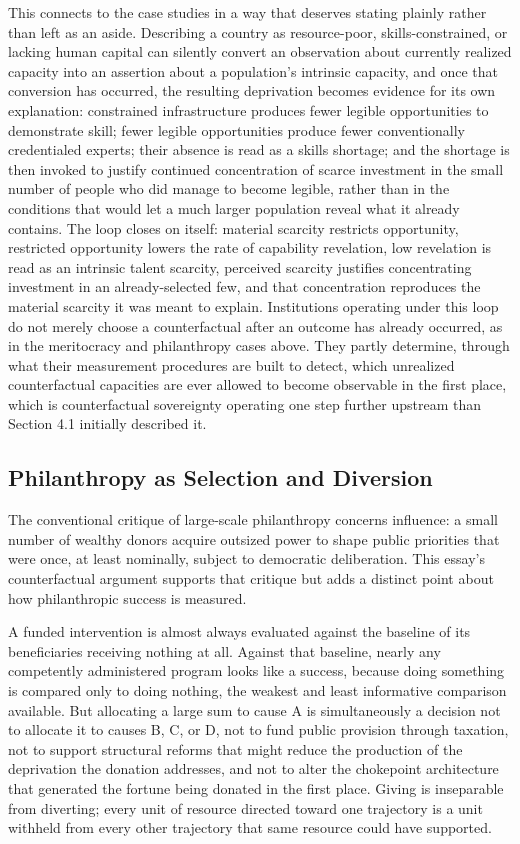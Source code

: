 \documentclass[11pt]{article}
\begin{document}
This connects to the case studies in a way that deserves stating plainly rather than left as an aside. Describing a country as resource-poor, skills-constrained, or lacking human capital can silently convert an observation about currently realized capacity into an assertion about a population's intrinsic capacity, and once that conversion has occurred, the resulting deprivation becomes evidence for its own explanation: constrained infrastructure produces fewer legible opportunities to demonstrate skill; fewer legible opportunities produce fewer conventionally credentialed experts; their absence is read as a skills shortage; and the shortage is then invoked to justify continued concentration of scarce investment in the small number of people who did manage to become legible, rather than in the conditions that would let a much larger population reveal what it already contains. The loop closes on itself: material scarcity restricts opportunity, restricted opportunity lowers the rate of capability revelation, low revelation is read as an intrinsic talent scarcity, perceived scarcity justifies concentrating investment in an already-selected few, and that concentration reproduces the material scarcity it was meant to explain. Institutions operating under this loop do not merely choose a counterfactual after an outcome has already occurred, as in the meritocracy and philanthropy cases above. They partly determine, through what their measurement procedures are built to detect, which unrealized counterfactual capacities are ever allowed to become observable in the first place, which is counterfactual sovereignty operating one step further upstream than Section 4.1 initially described it.

\subsection{Philanthropy as Selection and Diversion}

The conventional critique of large-scale philanthropy concerns influence: a small number of wealthy donors acquire outsized power to shape public priorities that were once, at least nominally, subject to democratic deliberation. This essay's counterfactual argument supports that critique but adds a distinct point about how philanthropic success is measured.

A funded intervention is almost always evaluated against the baseline of its beneficiaries receiving nothing at all. Against that baseline, nearly any competently administered program looks like a success, because doing something is compared only to doing nothing, the weakest and least informative comparison available. But allocating a large sum to cause A is simultaneously a decision not to allocate it to causes B, C, or D, not to fund public provision through taxation, not to support structural reforms that might reduce the production of the deprivation the donation addresses, and not to alter the chokepoint architecture that generated the fortune being donated in the first place. Giving is inseparable from diverting; every unit of resource directed toward one trajectory is a unit withheld from every other trajectory that same resource could have supported.
\end{document}
